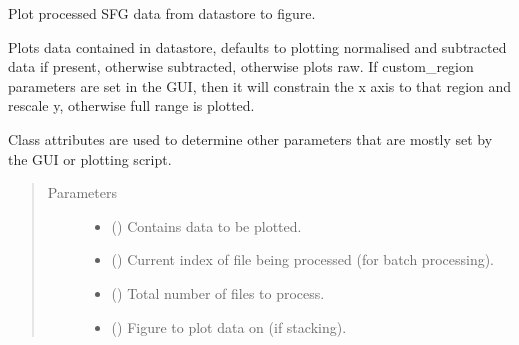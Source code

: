 \documentclass[a4paper,10pt,english]{sphinxmanual}
\begin{document}
\begin{fulllineitems}
\begin{fulllineitems}
\begin{quote}
\begin{description}
\begin{itemize}
\end{itemize}

\end{description}\end{quote}

\end{fulllineitems}


\begin{fulllineitems}
\label{\detokenize{sfgtools:sfgtools.SFGProcessTools.plot_data}}
\sphinxAtStartPar
Plot processed SFG data from datastore to figure.

\sphinxAtStartPar
Plots data contained in datastore, defaults to plotting normalised and subtracted data if present,
otherwise subtracted, otherwise plots raw. If custom\_region parameters are set in the GUI,
then it will constrain the x axis to that region and rescale y, otherwise full range is plotted.

\sphinxAtStartPar
Class attributes are used to determine other parameters that are mostly set by the GUI or plotting
script.
\begin{quote}\begin{description}
\item[{Parameters}] \leavevmode\begin{itemize}
\item {} 
\sphinxAtStartPar
{} () \textendash{} Contains data to be plotted.

\item {} 
\sphinxAtStartPar
{} () \textendash{} Current index of file being processed (for batch processing).

\item {} 
\sphinxAtStartPar
{} () \textendash{} Total number of files to process.

\item {} 
\sphinxAtStartPar
{} () \textendash{} Figure to plot data on (if stacking).


\end{itemize}
\end{description}
\end{quote}
\end{fulllineitems}
\end{fulllineitems}
\end{document}
